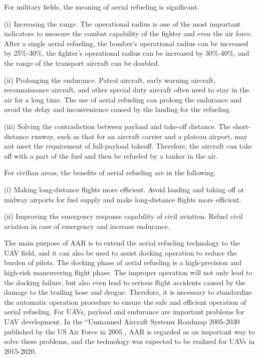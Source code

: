 For military fields, the meaning of aerial refueling is significant. 

(i) Increasing the range. The operational radius is one of the most
important indicators to measure the combat capability of the fighter
and even the air force. After a single aerial refueling, the bomber's
operational radius can be increased by 25\%-30\%, the fighter's operational
radius can be increased by 30\%-40\%, and the range of the transport
aircraft can be doubled. 

(ii) Prolonging the endurance. Patrol aircraft, early warning aircraft,
reconnaissance aircraft, and other special duty aircraft often need
to stay in the air for a long time. The use of aerial refueling can
prolong the endurance and avoid the delay and inconvenience caused
by the landing for the refueling. 

(iii) Solving the contradiction between payload and take-off distance.
The short-distance runway, such as that for an aircraft carrier and
a plateau airport, may not meet the requirement of full-payload takeoff.
Therefore, the aircraft can take off with a part of the fuel and then
be refueled by a tanker in the air. 

For civilian areas, the benefits of aerial refueling are in the following. 

(i) Making long-distance flights more efficient. Avoid landing and
taking off at midway airports for fuel supply and make long-distance
flights more efficient. 

(ii) Improving the emergency response capability of civil aviation.
Refuel civil aviation in case of emergency and increase endurance. 

The main purpose of AAR is to extend the aerial refueling technology
to the UAV field, and it can also be used to assist docking operation
to reduce the burden of pilots. The docking phase of aerial refueling
is a high-precision and high-risk maneuvering flight phase. The improper
operation will not only lead to the docking failure, but also even
lead to serious flight accidents caused by the damage to the trailing
hose and drogue. Therefore, it is necessary to standardize the automatic
operation procedure to ensure the safe and efficient operation of
aerial refueling. For UAVs, payload and endurance are important problems
for UAV development. In the \textquotedblleft Unmanned Aircraft Systems
Roadmap 2005-2030\textquotedbl{} published by the US Air Force in
2005 \cite{cambone2005unmanned}, AAR is regarded as an important
way to solve these problems, and the technology was expected to be
realized for UAVs in 2015-2020. 

